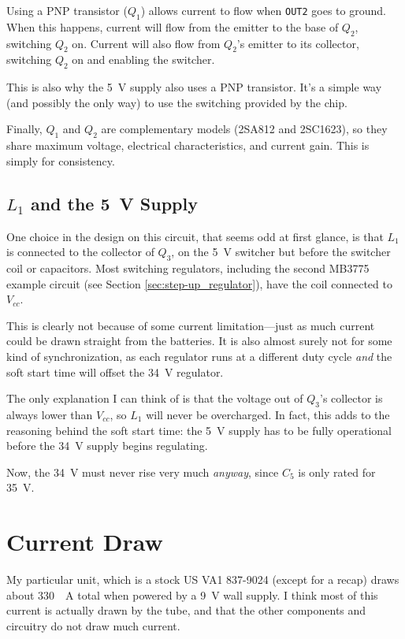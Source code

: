 \documentclass{article}
\newcommand{\Vcc}{$V_{cc}$}
\newcommand{\chippin}{\texttt}
\newcommand{\model}{\textsf}
\begin{document}
Using a PNP transistor ($Q_1$) allows current to flow when
\chippin{OUT2} goes to ground. When this happens, current will flow
from the emitter to the base of $Q_2$, switching $Q_2$ on. Current
will also flow from $Q_2$'s emitter to its collector, switching $Q_2$
on and enabling the switcher.

This is also why the \qty{5}{\volt} supply also uses a PNP
transistor. It's a simple way (and possibly the only way) to use the
switching provided by the chip.

Finally, $Q_1$ and $Q_2$ are complementary models (\model{2SA812} and
\model{2SC1623}), so they share maximum voltage, electrical
characteristics, and current gain. This is simply for consistency.

\subsection{$L_1$ and the \qty{5}{\volt} Supply}
\label{sec:l1_and_5v}
One choice in the design on this circuit, that seems odd at first
glance, is that $L_1$ is connected to the collector of $Q_3$, on the
\qty{5}{\volt} switcher but before the switcher coil or
capacitors. Most switching regulators, including the second
\model{MB3775} example circuit (see Section
\ref{sec:step-up_regulator}), have the coil connected to \Vcc{}.

This is clearly not because of some current limitation---just as much
current could be drawn straight from the batteries. It is also almost
surely not for some kind of synchronization, as each regulator runs at
a different duty cycle \textit{and} the soft start time will offset
the \qty{34}{\volt} regulator.

The only explanation I can think of is that the voltage out of $Q_3$'s
collector is always lower than \Vcc{}, so $L_1$ will never be
overcharged. In fact, this adds to the reasoning behind the soft start
time: the \qty{5}{\volt} supply has to be fully operational before the
\qty{34}{\volt} supply begins regulating.

Now, the \qty{34}{\volt} must never rise very much \textit{anyway},
since $C_5$ is only rated for \qty{35}{\volt}.

\section{Current Draw}
\label{sec:current_draw}
My particular unit, which is a stock \model{US VA1 837-9024} (except
for a recap) draws about \qty{330}{\milli{}A} total when powered by a
\qty{9}{\volt} wall supply. I think most of this current is actually
drawn by the tube, and that the other components and circuitry do not
draw much current.
\end{document}
